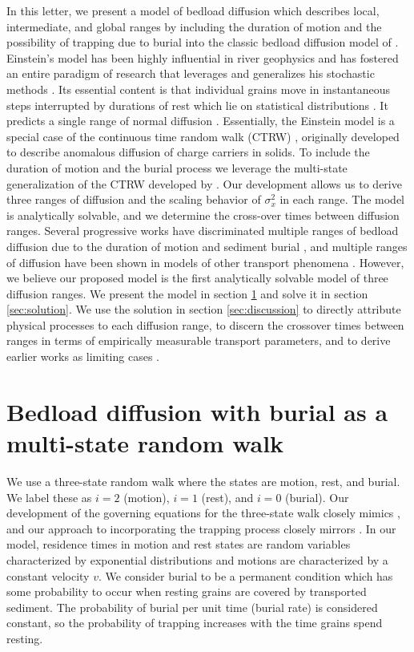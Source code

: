 \documentclass[]{agujournal2018}
\begin{document}
In this letter, we present a model of bedload diffusion which describes local, intermediate, and global ranges by including the duration of motion and the possibility of trapping due to burial into the classic bedload diffusion model of \citet{Einstein1937}.
Einstein's model has been highly influential in river geophysics and has fostered an entire paradigm of research that leverages and generalizes his stochastic methods \citep[e.g.][]{Hubbell1964, Yano1969, Yang1971, Gordon1972, Nakagawa1976}.
Its essential content is that individual grains move in instantaneous steps interrupted by durations of rest which lie on statistical distributions \citep{Hassan1991}.
It predicts a single range of normal diffusion \citep{Einstein1937, Nakagawa1976}.
Essentially, the Einstein model is a special case of the continuous time random walk (CTRW) \citep{Montroll1965}, originally developed to describe anomalous diffusion of charge carriers in solids.
To include the duration of motion and the burial process we leverage the multi-state generalization of the CTRW developed by \citet{Weiss1976, Weiss1994}.
Our development allows us to derive three ranges of diffusion and the scaling behavior of $\sigma_x^2$ in each range. The model is analytically solvable, and we determine the cross-over times between diffusion ranges.
Several progressive works have discriminated multiple ranges of bedload diffusion due to the duration of motion \citep{Lisle1998} and sediment burial \citep{Wu2019}, and multiple ranges of diffusion have been shown in models of other transport phenomena \cite[e.g.][]{Bena2006, Balakrishnan1988, Flekkøy2017, AaraoReis2014}.
However, we believe our proposed model is the first analytically solvable model of three diffusion ranges.
We present the model in section \ref{sec:model} and solve it in section \ref{sec:solution}.
We use the solution in section \ref{sec:discussion} to directly attribute physical processes to each diffusion range, to discern the crossover times between ranges in terms of empirically measurable transport parameters, and to derive earlier works as limiting cases \citep[e.g.][]{Lisle1998,Wu2019,Einstein1937}.

\section{Bedload diffusion with burial as a multi-state random walk}
\label{sec:model}
We use a three-state random walk where the states are motion, rest, and burial.
We label these as $i=2$ (motion), $i=1$ (rest), and $i=0$ (burial).
Our development of the governing equations for the three-state walk closely mimics \citet{Weiss1994}, and our approach to incorporating the trapping process closely mirrors \citet{Schmidt2007}. 
In our model, residence times in motion and rest states are random variables characterized by exponential distributions and motions are characterized by a constant velocity $v$.
We consider burial to be a permanent condition which has some probability to occur when resting grains are covered by transported sediment.
The probability of burial per unit time (burial rate) is considered constant, so the probability of trapping increases with the time grains spend resting.
\end{document}
